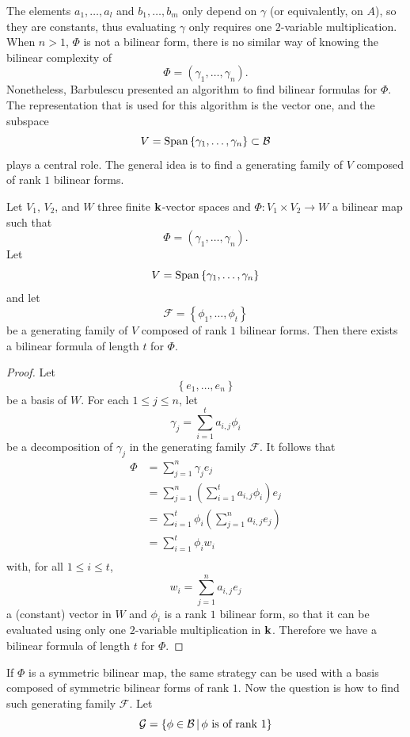The elements $a_1, \dots, a_l$ and $b_1, \dots, b_m$ only depend on $\gamma$ (or
equivalently, on $A$), so they are constants, thus evaluating $\gamma$ only
requires one $2$-variable multiplication.
When $n>1$, \ie $\Phi$ is not a
bilinear form, there is no similar way of knowing the bilinear complexity of
\[
  \Phi = (\gamma_1, \dots, \gamma_n).
\]
Nonetheless, Barbulescu \etal presented an algorithm to find bilinear formulas
for $\Phi$. The representation that is used for this algorithm is the vector
one, and the subspace
\[
  V = \operatorname{Span}\left\{ \gamma_1, \dots, \gamma_n \right\}\subset\mathcal{B}
\]
plays a central role. The general idea is to find a generating family of $V$ composed of
rank $1$ bilinear forms.
\begin{prop}
  Let $V_1$, $V_2$, and $W$ three finite $\mathbf{k}$-vector spaces and $\Phi:V_1\times
  V_2\to W$ a bilinear map such that
  \[
    \Phi = (\gamma_1, \dots, \gamma_n).
  \]
  Let 
  \[
    V = \operatorname{Span}\left\{ \gamma_1, \dots, \gamma_n \right\}
  \]
  and let 
  \[
    \mathcal F = \left\{ \phi_1, \dots, \phi_t \right\}
  \]
  be a generating family of $V$ composed of rank $1$ bilinear forms. Then there
  exists a bilinear formula of length $t$ for $\Phi$.
\end{prop}
\begin{proof}
 Let 
 \[
   \left\{ e_1, \dots, e_n \right\}
 \]
 be a basis of $W$.  For each $1\leq j \leq n$, let
 \[
   \gamma_j = \sum_{i=1}^t a_{i, j} \phi_i
 \]
 be a decomposition of $\gamma_j$ in the generating family $\mathcal F$.
 It follows that
 \begin{align*}
   \Phi &= \sum_{j=1}^n\gamma_j e_j \\
   &= \sum_{j=1}^n (\sum_{i=1}^ta_{i, j}\phi_i)e_j\\
   &= \sum_{i=1}^t \phi_i (\sum_{j=1}^n a_{i, j}e_j)\\
   &= \sum_{i=1}^t \phi_i w_i\\
 \end{align*}
 with, for all $1\leq i\leq t$,
\[
  w_i = \sum_{j=1}^n a_{i, j}e_j
\]
a (constant) vector in $W$ and $\phi_i$ is a rank $1$ bilinear form, so that
it can be evaluated using only one $2$-variable multiplication in $\mathbf{k}$. Therefore
we have a bilinear formula of length $t$ for $\Phi$.
\end{proof}
If $\Phi$ is a symmetric bilinear map, the same strategy can be used with a
basis composed of symmetric bilinear forms of rank $1$. Now the question is how
to find such generating family $\mathcal F$. Let 
\[
  \mathcal{G} = \left\{ \phi\in\mathcal{B}\,|\,\phi\text{ is of rank }1 \right\}
\]
